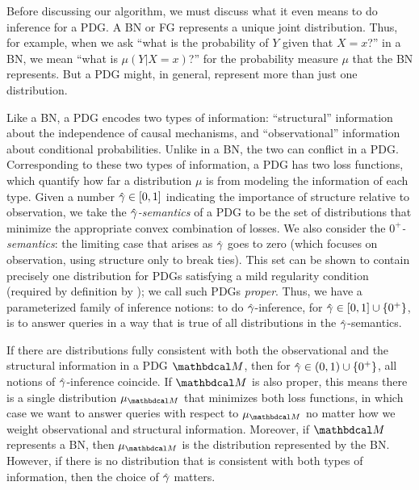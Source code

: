 Before discussing our algorithm, 
we must discuss what it even means to do inference for a PDG.  
A BN or FG represents 
a unique joint distribution. 
Thus, for example, when we ask ``what is the probability of $Y$ given that $X{=}x$?''
\def\BNPr{\mu}
in a BN, we mean ``what is $\BNPr(Y | X{=}x)$?'' for the probability 
measure $\BNPr$ that the BN represents.
But a PDG might, in general, represent more than just one distribution.

Like a BN, a PDG encodes
two types of information: ``structural'' 
information about the independence of causal mechanisms,
and ``observational'' information
about conditional probabilities.
Unlike in a BN, the two can conflict in a PDG.
Corresponding to these two types of information,
a PDG has two
loss functions,
which quantify how far a distribution $\mu$ is from
modeling the information of each type.
Given a number $\zogamma
\in [0,1]
$
indicating the importance of structure relative to observation,
we take the \emph{$\zogamma$-semantics} of a PDG to be the
set of distributions that minimize 
the appropriate convex combination of
losses.
We also consider the \emph{$0^+$\!-semantics}: the limiting case that
arises as $\zogamma$ goes to zero
(which focuses
 on observation, using structure only to break ties).
This set
can be shown to contain precisely one distribution
for PDGs satisfying a mild regularity condition 
(required by definition by \citeauthor{pdg-aaai});
we call such PDGs \emph{proper}.
Thus, we have
 a parameterized family of inference notions:
to do $\zogamma$-inference, for $\zogamma \in [0,1] \cup \{0^+\}$,
is to answer queries in a way that is true of all distributions in the $\zogamma$-semantics.

If there are distributions
fully
consistent with
both the observational and the structural information
in a PDG $\dg M$, 
then for $\zogamma \in (0,1) \cup \{0^+\}$, all
notions of $\zogamma$-inference 
coincide.
%
\def\PrM{\mu_{\dg M}}%
If $\dg M$ is also proper,
    this means there is
    a single distribution $\PrM$
    that minimizes both loss functions, 
    in which case we want to answer queries with respect to $\PrM$
    no matter how we weight observational and structural information. 
Moreover, if $\dg M$ represents a BN,
then $\PrM$ is the distribution represented by the BN.  
However, if there is no distribution that is consistent with both types of information, then the choice of $\zogamma$ matters.  


